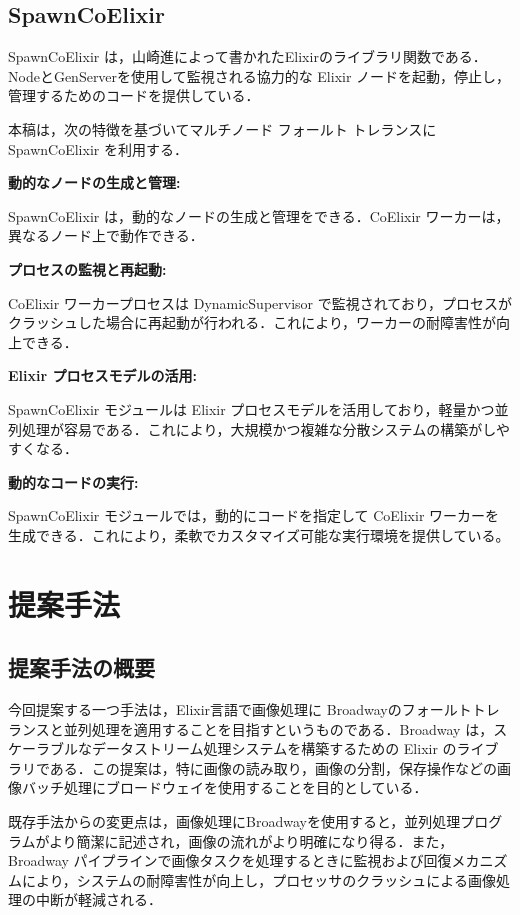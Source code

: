 \documentclass[a4paper]{jreport}	%
\begin{document}
\section{SpawnCoElixir}
SpawnCoElixir は，山崎進によって書かれたElixirのライブラリ関数である．NodeとGenServerを使用して監視される協力的な Elixir ノードを起動，停止し，管理するためのコードを提供している\cite{N}．

本稿は，次の特徴を基づいてマルチノード フォールト トレランスに SpawnCoElixir を利用する．

\textbf{動的なノードの生成と管理:}

SpawnCoElixir は，動的なノードの生成と管理をできる．CoElixir ワーカーは，異なるノード上で動作できる．

\textbf{プロセスの監視と再起動:}

CoElixir ワーカープロセスは DynamicSupervisor で監視されており，プロセスがクラッシュした場合に再起動が行われる．これにより，ワーカーの耐障害性が向上できる．

\textbf{Elixir プロセスモデルの活用:}

SpawnCoElixir モジュールは Elixir プロセスモデルを活用しており，軽量かつ並列処理が容易である．これにより，大規模かつ複雑な分散システムの構築がしやすくなる．

\textbf{動的なコードの実行:}

SpawnCoElixir モジュールでは，動的にコードを指定して CoElixir ワーカーを生成できる．これにより，柔軟でカスタマイズ可能な実行環境を提供している。
\chapter{提案手法}
\section{提案手法の概要}
今回提案する一つ手法は，Elixir言語で画像処理に Broadwayのフォールトトレランスと並列処理を適用することを目指すというものである．Broadway は，スケーラブルなデータストリーム処理システムを構築するための Elixir のライブラリである．この提案は，特に画像の読み取り，画像の分割，保存操作などの画像バッチ処理にブロードウェイを使用することを目的としている． 

既存手法からの変更点は，画像処理にBroadwayを使用すると，並列処理プログラムがより簡潔に記述され，画像の流れがより明確になり得る．また，Broadway パイプラインで画像タスクを処理するときに監視および回復メカニズムにより，システムの耐障害性が向上し，プロセッサのクラッシュによる画像処理の中断が軽減される．
\end{document}
